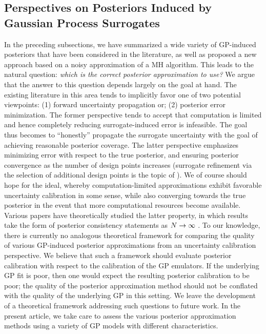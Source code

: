\documentclass[12pt]{article}
\begin{document}
\subsection{Perspectives on Posteriors Induced by Gaussian Process Surrogates}
In the preceding subsections, we have summarized a wide variety of GP-induced posteriors that have been considered 
in the literature, as well as proposed a new approach based on a noisy approximation of a MH algorithm. This leads to 
the natural question: \textit{which is the correct posterior approximation to use?} We argue that the answer to this question 
depends largely on the goal at hand. The existing literature in this area tends to implicitly favor one of two potential 
viewpoints: (1) forward uncertainty propagation or; (2) posterior error minimization. The former perspective tends to 
accept that computation is limited and hence completely reducing surrogate-induced error is infeasible. The goal thus 
becomes to ``honestly'' propagate the surrogate uncertainty with the goal of achieving reasonable posterior coverage. 
The latter perspective emphasizes minimizing 
error with respect to the true posterior, and ensuring posterior convergence as the number of design points increases
(surrogate refinement via the selection of additional design points is the topic of  ). We of course should 
hope for the ideal, whereby computation-limited approximations exhibit favorable 
uncertainty calibration in some sense, while also converging towards the true posterior in the event that more 
computational resources become available. Various papers have theoretically studied the latter property, in which results 
take the form of posterior consistency statements as $N \to \infty$
 \citep{StuartTeck1,StuartTeck2,random_fwd_models,gp_surrogates_random_exploration}. To our knowledge, there is 
 currently no analogous theoretical framework for comparing the quality of various GP-induced posterior approximations
 from an uncertainty calibration perspective. We believe that such a framework should evaluate posterior calibration with 
 respect to the calibration of the GP emulators. If the underlying GP fit is poor, then one would expect the resulting posterior 
 calibration to be poor; the quality of the posterior approximation method should not be conflated with the quality of the 
 underlying GP in this setting. We leave the development of a theoretical framework addressing such questions to future 
 work. In the present article, we take care to assess the various posterior approximation methods using a variety of GP 
 models with different characteristics. 
 
\end{document}

